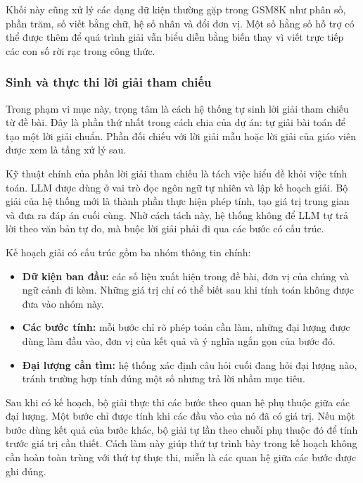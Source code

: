 \documentclass[12pt,a4paper]{article}
\begin{document}
Khối này cũng xử lý các dạng dữ kiện thường gặp trong GSM8K như phân số, phần
trăm, số viết bằng chữ, hệ số nhân và đổi đơn vị. Một số hằng số hỗ trợ có thể
được thêm để quá trình giải vẫn biểu diễn bằng biến thay vì viết trực tiếp các
con số rời rạc trong công thức.

\subsubsection{Sinh và thực thi lời giải tham chiếu}

Trong phạm vi mục này, trọng tâm là cách hệ thống tự sinh lời giải tham chiếu từ
đề bài. Đây là phần thứ nhất trong cách chia của dự án: tự giải bài toán để tạo
một lời giải chuẩn. Phần đối chiếu với lời giải mẫu hoặc lời giải của giáo viên
được xem là tầng xử lý sau.

Kỹ thuật chính của phần lời giải tham chiếu là tách việc hiểu đề khỏi việc tính
toán. LLM được dùng ở vai trò đọc ngôn ngữ tự nhiên và lập kế hoạch giải. Bộ
giải của hệ thống mới là thành phần thực hiện phép tính, tạo giá trị trung gian
và đưa ra đáp án cuối cùng. Nhờ cách tách này, hệ thống không để LLM tự trả lời
theo văn bản tự do, mà buộc lời giải phải đi qua các bước có cấu trúc.

Kế hoạch giải có cấu trúc gồm ba nhóm thông tin chính:

\begin{itemize}[leftmargin=*]
    \item \textbf{Dữ kiện ban đầu:} các số liệu xuất hiện trong đề bài, đơn vị
    của chúng và ngữ cảnh đi kèm. Những giá trị chỉ có thể biết sau khi tính toán
    không được đưa vào nhóm này.
    \item \textbf{Các bước tính:} mỗi bước chỉ rõ phép toán cần làm, những đại
    lượng được dùng làm đầu vào, đơn vị của kết quả và ý nghĩa ngắn gọn của bước
    đó.
    \item \textbf{Đại lượng cần tìm:} hệ thống xác định câu hỏi cuối đang hỏi
    đại lượng nào, tránh trường hợp tính đúng một số nhưng trả lời nhầm mục tiêu.
\end{itemize}

Sau khi có kế hoạch, bộ giải thực thi các bước theo quan hệ phụ thuộc giữa các
đại lượng. Một bước chỉ được tính khi các đầu vào của nó đã có giá trị. Nếu một
bước dùng kết quả của bước khác, bộ giải tự lần theo chuỗi phụ thuộc đó để tính
trước giá trị cần thiết. Cách làm này giúp thứ tự trình bày trong kế hoạch không
cần hoàn toàn trùng với thứ tự thực thi, miễn là các quan hệ giữa các bước được
ghi đúng.
\end{document}
